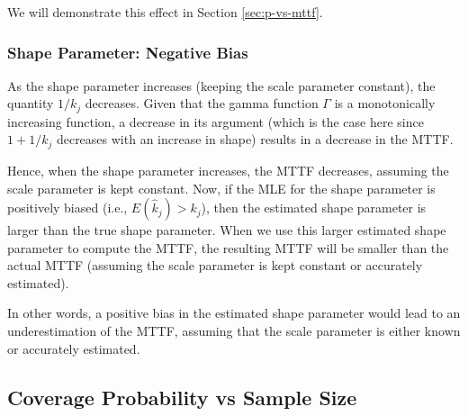 \documentclass[
]{article}
\begin{document}
We will demonstrate this effect in Section \ref{sec:p-vs-mttf}.

\hypertarget{shape-parameter-negative-bias}{%
\subsubsection{Shape Parameter: Negative
Bias}\label{shape-parameter-negative-bias}}

As the shape parameter increases (keeping the scale parameter constant),
the quantity \(1/k_j\) decreases. Given that the gamma function
\(\Gamma\) is a monotonically increasing function, a decrease in its
argument (which is the case here since \(1 + 1/k_j\) decreases with an
increase in shape) results in a decrease in the MTTF.

Hence, when the shape parameter increases, the MTTF decreases, assuming
the scale parameter is kept constant. Now, if the MLE for the shape
parameter is positively biased (i.e., \(E(\hat k_j) > k_j\)), then the
estimated shape parameter is larger than the true shape parameter. When
we use this larger estimated shape parameter to compute the MTTF, the
resulting MTTF will be smaller than the actual MTTF (assuming the scale
parameter is kept constant or accurately estimated).

In other words, a positive bias in the estimated shape parameter would
lead to an underestimation of the MTTF, assuming that the scale
parameter is either known or accurately estimated.

\hypertarget{coverage-probability-vs-sample-size}{%
\subsection{Coverage Probability vs Sample
Size}\label{coverage-probability-vs-sample-size}}
\end{document}
